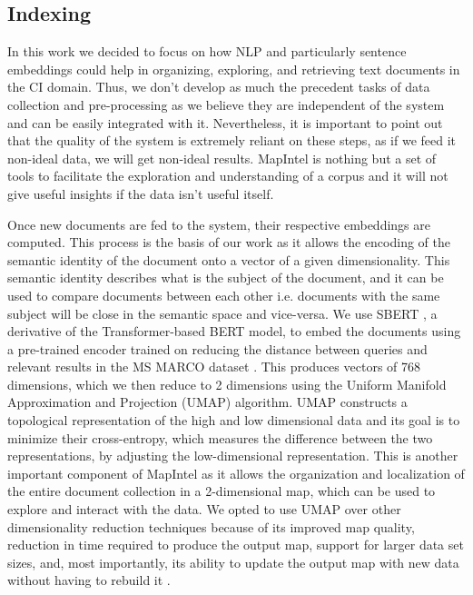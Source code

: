 \documentclass[a4paper]{article}
\begin{document}
\subsection{Indexing} \label{indexing}
In this work we decided to focus on how NLP and particularly sentence embeddings could help in organizing, exploring, and retrieving text documents in the CI domain. Thus, we don't develop as much the precedent tasks of data collection and pre-processing as we believe they are independent of the system and can be easily integrated with it. Nevertheless, it is important to point out that the quality of the system is extremely reliant on these steps, as if we feed it non-ideal data, we will get non-ideal results. MapIntel is nothing but a set of tools to facilitate the exploration and understanding of a corpus and it will not give useful insights if the data isn't useful itself. 

Once new documents are fed to the system, their respective embeddings are computed. This process is the basis of our work as it allows the encoding of the semantic identity of the document onto a vector of a given dimensionality. This semantic identity describes what is the subject of the document, and it can be used to compare documents between each other i.e. documents with the same subject will be close in the semantic space and vice-versa. We use SBERT \citep{reimers2019}, a derivative of the Transformer-based BERT model, to embed the documents using a pre-trained encoder trained on reducing the distance between queries and relevant results in the MS MARCO dataset \citep{bajaj2018}. This produces vectors of 768 dimensions, which we then reduce to 2 dimensions using the Uniform Manifold Approximation and Projection (UMAP) \citep{mcinnes2020} algorithm. UMAP constructs a topological representation of the high and low dimensional data and its goal is to minimize their cross-entropy, which measures the difference between the two representations, by adjusting the low-dimensional representation. This is another important component of MapIntel as it allows the organization and localization of the entire document collection in a 2-dimensional map, which can be used to explore and interact with the data. We opted to use UMAP over other dimensionality reduction techniques because of its improved map quality, reduction in time required to produce the output map, support for larger data set sizes, and, most importantly, its ability to update the output map with new data without having to rebuild it \citep{mcinnes2020}.
\end{document}
